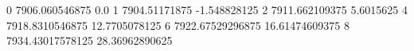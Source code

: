 0 7906.060546875 0.0
1 7904.51171875 -1.548828125
2 7911.662109375 5.6015625
4 7918.8310546875 12.7705078125
6 7922.67529296875 16.61474609375
8 7934.43017578125 28.36962890625
